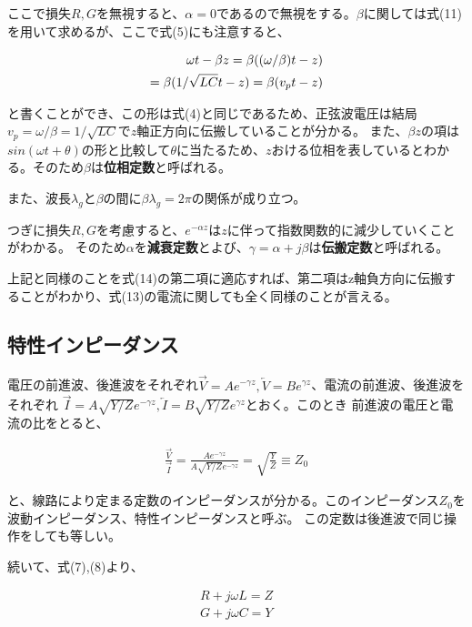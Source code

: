 \documentclass[7pt,uplatex,dvipdfmx,twocolumn]{jsarticle}
\begin{document}
ここで損失$R,G$を無視すると、$\alpha=0$であるので無視をする。$\beta$に関しては式(11)を用いて求めるが、ここで式(5)にも注意すると、

\begin{align}
  \omega t-\beta z=\beta((\omega / \beta)t-z)\\
  =\beta(1/\sqrt{LC}t-z)=\beta (v_pt-z)\notag
  \end{align}

と書くことができ、この形は式(4)と同じであるため、正弦波電圧は結局$v_p=\omega /\beta=1/\sqrt{LC}$で$z$軸正方向に伝搬していることが分かる。
また、$\beta z$の項は$sin(\omega t+\theta)$の形と比較して$\theta$に当たるため、$z$おける位相を表しているとわかる。そのため$\beta$は\textbf{位相定数}と呼ばれる。

また、波長$\lambda_g$と$\beta$の間に$\beta \lambda_g=2\pi$の関係が成り立つ。

つぎに損失$R,G$を考慮すると、$e^{-\alpha z}$は$z$に伴って指数関数的に減少していくことがわかる。
そのため$\alpha$を\textbf{減衰定数}とよび、$\gamma =\alpha +j\beta$は\textbf{伝搬定数}と呼ばれる。

上記と同様のことを式(14)の第二項に適応すれば、第二項はz軸負方向に伝搬することがわかり、式(13)の電流に関しても全く同様のことが言える。

\subsection{特性インピーダンス}

電圧の前進波、後進波をそれぞれ$\overrightarrow{V}=Ae^{-\gamma z},\overleftarrow{V}=Be^{\gamma z}$、電流の前進波、後進波をそれぞれ
$\overrightarrow{I}=A\sqrt{Y/Z}e^{-\gamma z},\overleftarrow{I}=B\sqrt{Y/Z}e^{\gamma z}$とおく。このとき
前進波の電圧と電流の比をとると、

\begin{align}
\frac{\overrightarrow{V}}{\overrightarrow{I}}=\frac{Ae^{-\gamma z}}{A\sqrt{Y/Z}e^{-\gamma z}}=\sqrt{\frac{Y}{Z}}\equiv Z_{0}
\end{align}

と、線路により定まる定数のインピーダンスが分かる。このインピーダンス$Z_{0}$を波動インピーダンス、特性インピーダンスと呼ぶ。
この定数は後進波で同じ操作をしても等しい。

続いて、式(7),(8)より、

\begin{align}
R+j\omega L=Z \\
G+j\omega C=Y
\end{align}
\end{document}
